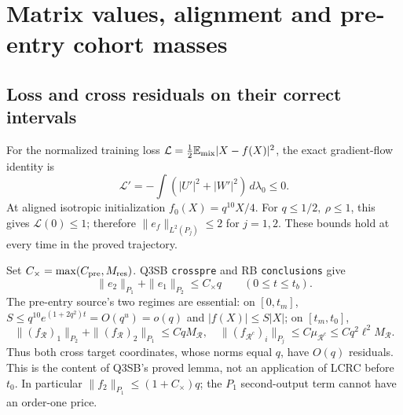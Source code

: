 \documentclass[11pt]{article}
\numberwithin{equation}{section}
\theoremstyle{remark}\newtheorem{remark}[theorem]{Remark}
\newcommand{\E}{\mathbb E}\newcommand{\dd}{\,d}
\begin{document}
\section{Matrix values, alignment and pre-entry cohort masses}
\label{an07psev1:inputs}
\subsection{Loss and cross residuals on their correct intervals}
For the normalized training loss
\(\mathcal L=\tfrac12\E_{\rm mix}|X-f(X)|^2\), the exact
gradient-flow identity is
\[
 \mathcal L'=-\int(|U'|^2+|W'|^2)\dd\lambda_0\le0.
 \]
At aligned isotropic initialization \(f_0(X)=q^{10}X/4\).
For \(q\le1/2,\ \rho\le1\), this gives \(\mathcal L(0)\le1\);
therefore \(\|e_f\|_{L^2(P_j)}\le2\) for \(j=1,2\).
These bounds hold at every time in the proved trajectory.

Set \(C_\times=\max(C_{\rm pre},M_{\rm res})\).
Q3SB \texttt{crosspre} and RB \texttt{conclusions} give
\begin{equation}
 \|e_2\|_{P_1}+\|e_1\|_{P_2}\le C_\times q
                 \qquad(0\le t\le t_b).
 \label{an07psev1:cross}
\end{equation}
The pre-entry source's two regimes are essential:
on \([0,t_m]\), \(S\le q^{10}e^{(1+2q^2)t}=O(q^u)=o(q)\)
and \(|f(X)|\le S|X|\); on \([t_m,t_0]\),
\[
 \|(f_{\mathcal R})_1\|_{P_2}
 +\|(f_{\mathcal R})_2\|_{P_1}\le CqM_{\mathcal R},
 \quad
 \|(f_{\mathcal R^c})_i\|_{P_j}\le C\mu_{\mathcal R^c}
 \le Cq^2\ell^2M_{\mathcal R}.
 \]
Thus both cross target coordinates, whose norms equal \(q\),
have \(O(q)\) residuals. This is the content of Q3SB's proved
lemma, not an application of LCRC before \(t_0\).
In particular \(\|f_2\|_{P_1}\le(1+C_\times)q\);
the \(P_1\) second-output term cannot have an order-one price.
\end{document}
